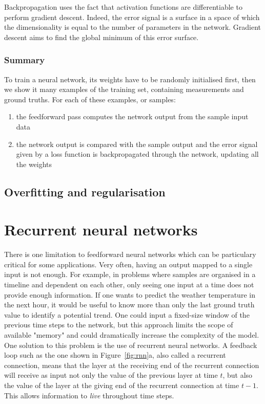 Backpropagation uses the fact that activation functions are differentiable to
perform gradient descent. Indeed, the error signal is a surface in a space
of which the dimensionality is equal to the number of parameters in the
network. Gradient descent aims to find the global minimum of this error
surface.\\


\subsubsection{Summary}
To train a neural network, its weights have to be randomly initialised first,
then we show it many examples of the training set, containing measurements and
ground truths. For each of these examples, or samples:
\begin{enumerate}
	\item the feedforward pass computes the network output from the sample
		input data
	\item the network output is compared with the sample output and the
		error signal given by a loss function
		is backpropagated through the network, updating
		all the weights
\end{enumerate}

\subsection{Overfitting and regularisation}
\label{sec:regularisation}

\section{Recurrent neural networks}
There is one limitation to feedforward neural networks which can be particulary
critical for some applications. Very often, having an output mapped to a 
single input is not enough. For example, in problems where samples are organised
in a timeline and dependent on each other, only seeing one input at a time
does not provide enough information. If one wants to predict the weather
temperature in the next hour, it would be useful to know more than only the
last ground truth value to identify a potential trend. One 
could input a fixed-size window of the previous time steps to the network,
but this approach limits the scope of available "memory" and could dramatically
increase the complexity of the model.\\

One solution to this problem is the use of recurrent neural networks.
A feedback loop such as the one shown in Figure~\ref{fig:rnn}a, also called
a recurrent connection, means that the layer at the receiving end of the
recurrent connection will receive as input not only the value of the previous
layer at time $t$, but also the value of the layer at the giving end of the 
recurrent connection at time $t-1$. This allows information to \textit{live}
throughout time steps.\\

